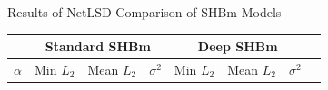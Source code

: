 \begin{singlespacing}
    \begin{center}
    \begin{threeparttable}
    \caption{Results of NetLSD Comparison of SHBm Models}
    \label{fig:tab_SHBm_results}\begin{small}
        \begin{tabular}{|l|c|c|c|c|c|c|c|} \hline

        \multicolumn{1}{|c|}{} & \multicolumn{3}{|c|}{Standard SHBm} & \multicolumn{3}{|c|}{Deep SHBm} \\ \hline

        \multicolumn{1}{|c|}{$\alpha$} & Min $L_{2}$ & Mean $L_{2}$ & $\sigma^{2}$  & Min $L_{2}$ &  Mean $L_{2}$ & $\sigma^{2}$ \\  \cline{6-7}


\end{tabular}
\end{small}
\end{threeparttable}
\end{center}
\end{singlespacing}
